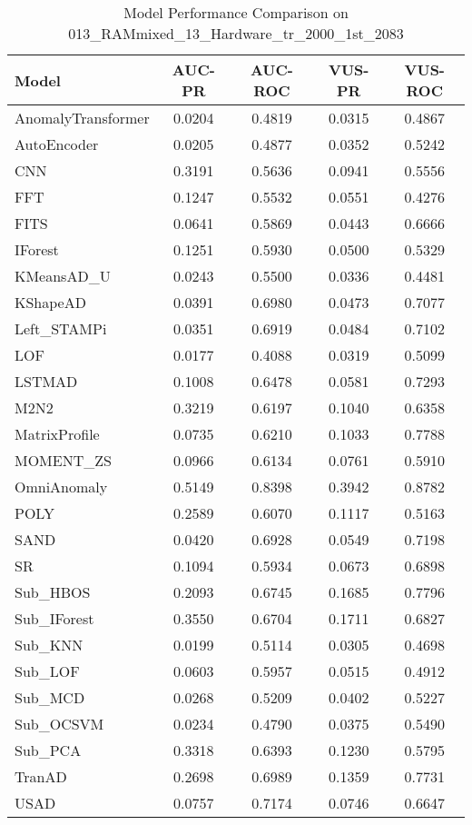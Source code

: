 \begin{table}[htbp]
\centering
\caption{Model Performance Comparison on 013\_RAMmixed\_13\_Hardware\_tr\_2000\_1st\_2083}
\label{tab:model_performance_RAMmixed}
\begin{tabular}{|l|c|c|c|c|}
\hline
\textbf{Model} & \textbf{AUC-PR} & \textbf{AUC-ROC} & \textbf{VUS-PR} & \textbf{VUS-ROC} \\
\hline
AnomalyTransformer & 0.0204 & 0.4819 & 0.0315 & 0.4867 \\
AutoEncoder & 0.0205 & 0.4877 & 0.0352 & 0.5242 \\
CNN & 0.3191 & 0.5636 & 0.0941 & 0.5556 \\
FFT & 0.1247 & 0.5532 & 0.0551 & 0.4276 \\
FITS & 0.0641 & 0.5869 & 0.0443 & 0.6666 \\
IForest & 0.1251 & 0.5930 & 0.0500 & 0.5329 \\
KMeansAD\_U & 0.0243 & 0.5500 & 0.0336 & 0.4481 \\
KShapeAD & 0.0391 & 0.6980 & 0.0473 & 0.7077 \\
Left\_STAMPi & 0.0351 & 0.6919 & 0.0484 & 0.7102 \\
LOF & 0.0177 & 0.4088 & 0.0319 & 0.5099 \\
LSTMAD & 0.1008 & 0.6478 & 0.0581 & 0.7293 \\
M2N2 & 0.3219 & 0.6197 & 0.1040 & 0.6358 \\
MatrixProfile & 0.0735 & 0.6210 & 0.1033 & 0.7788 \\
MOMENT\_ZS & 0.0966 & 0.6134 & 0.0761 & 0.5910 \\
OmniAnomaly & 0.5149 & 0.8398 & 0.3942 & 0.8782 \\
POLY & 0.2589 & 0.6070 & 0.1117 & 0.5163 \\
SAND & 0.0420 & 0.6928 & 0.0549 & 0.7198 \\
SR & 0.1094 & 0.5934 & 0.0673 & 0.6898 \\
Sub\_HBOS & 0.2093 & 0.6745 & 0.1685 & 0.7796 \\
Sub\_IForest & 0.3550 & 0.6704 & 0.1711 & 0.6827 \\
Sub\_KNN & 0.0199 & 0.5114 & 0.0305 & 0.4698 \\
Sub\_LOF & 0.0603 & 0.5957 & 0.0515 & 0.4912 \\
Sub\_MCD & 0.0268 & 0.5209 & 0.0402 & 0.5227 \\
Sub\_OCSVM & 0.0234 & 0.4790 & 0.0375 & 0.5490 \\
Sub\_PCA & 0.3318 & 0.6393 & 0.1230 & 0.5795 \\
TranAD & 0.2698 & 0.6989 & 0.1359 & 0.7731 \\
USAD & 0.0757 & 0.7174 & 0.0746 & 0.6647 \\
\hline
\end{tabular}
\end{table}
